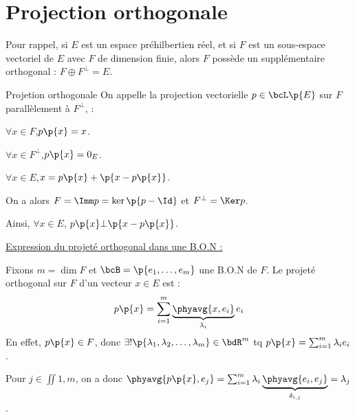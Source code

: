 \documentclass[a4paper,french,bookmarks]{article}
\begin{document}

    \initcours{}

    \section{Projection orthogonale}
    
    Pour rappel, si $E$ est un espace préhilbertien réel, et si $F$ est un sous-espace vectoriel de $E$ avec $F$ de dimension finie, alors $F$ possède un supplémentaire orthogonal : $F \oplus F^\bot = E$. 
    
    \begin{definition}{Projetion orthogonale}
        On appelle  la projection vectorielle $p \in \bcL\p{E}$ sur $F$ parallèlement à $F^\bot$, \ie :
        \begin{psse}
            \item $\forall x \in F$,\qquad $p\p{x} = x$.
            \item $\forall x \in F^\bot$,\qquad $p\p{x} = 0_E$.
            \item $\forall x \in E$,\qquad $x = p\p{x} + \p{x - p\p{x}}$.
        \end{psse}
    \end{definition}
    
    On a alors $F = \Imm p = \ker\p{p - \Id}$ et $F^\bot = \Ker p$.
    
    
    Ainsi, $\forall x \in E$, $p\p{x} \bot \p{x - p\p{x}}$.
    
    \underline{Expression du projeté orthogonal dans une B.O.N :}
    
    Fixons $m = \dim F$ et $\bcB = \p{e_1, \dots, e_m}$ une B.O.N de $F$. Le projeté orthogonal sur $F$ d'un vecteur $x \in E$ est :
    \[ p\p{x} = \sum_{i=1}^m \underbrace{\phyavg{x, e_i}}_{\lambda_i}e_i\]
    En effet, $p\p{x} \in F$, donc $\exists ! \p{\lambda_1, \lambda_2, \dots, \lambda_m} \in \bdR^m$ tq $p\p{x} = \sum_{i=1}^m \lambda_i e_i$.
    
    Pour $j \in \iint{1, m}$, on a donc $\phyavg{p\p{x}, e_j} = \sum_{i=1}^m \lambda_i \underbrace{\phyavg{e_i, e_j}}_{\delta_{i, j}} = \lambda_j$.
    
\end{document}
